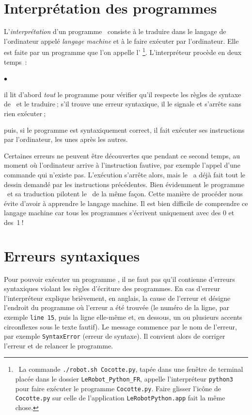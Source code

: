 \section{Interprétation des programmes} 
L'{\em interprétation} d'un programme \python\ consiste à le traduire 
dans le langage de l'or\-di\-na\-teur
appelé {\em langage machine} et à le faire exécuter par l'ordinateur. 
Elle est faite par un programme
que l'on appelle l' \python\@\footnote{\ La commande 
{\tt ./robot.sh Cocotte.py}, tapée dans une 
fenêtre de terminal placée dans le dossier {\tt LeRobot\_Python\_FR}, appelle l'interpréteur 
{\tt python3} pour faire exécuter le programme {\tt Cocotte.py}. Faire glisser l'icône de 
{\tt Cocotte.py} sur celle de l'application {\tt LeRobotPython.app} fait la même chose.}.
L'interpréteur procède en deux temps~:
\begin{list}{$\scriptscriptstyle\bullet$}{
\renewcommand{\rightmargin}{0mm}
}
\item il lit d'abord {\em tout} le programme pour vérifier qu'il respecte les règles 
de syntaxe de \python\ et le traduire$\:$; s'il trouve une erreur syntaxique, il le signale 
et s'arrête sans rien exécuter$\:$;
\item puis, si le programme est syntaxiquement correct, il fait exécuter ses 
instructions par l'ordinateur, les unes après les autres.
\end{list}
Certaines erreurs ne peuvent être découvertes que pendant ce second temps, au moment où 
l'or\-di\-na\-teur arrive à l'instruction fautive, par exemple l'appel d'une commande qui n'existe 
pas. L'exécution s'arrête alors, mais le \robot\ a déjà fait tout le dessin demandé 
par les instructions précédentes.
Bien évidemment le programme \python\ et sa traduction pilotent
le \robot\ de la même façon. Cette manière de procéder nous 
évite d'avoir à apprendre le langage machine. Il est bien difficile
de comprendre ce langage machine car tous les programmes s'écrivent
uniquement avec des 0 et \hbox{des 1$\:$!}

\section{Erreurs syntaxiques} 

Pour pouvoir exécuter un programme \python, il ne faut pas qu'il contienne
d'erreurs syntaxiques violant les règles
d'écriture des programmes. En cas d'erreur l'interpréteur explique 
brièvement, en anglais, la cause de l'erreur et désigne l'endroit du programme
où l'er\-reur a été trouvée (le numéro de la ligne, par exemple {\tt line 15}, puis la ligne 
elle-même et, en dessous, un ou plusieurs 
accents circonflexes {\idt {}} sous le texte fautif). Le message commence par 
le nom de l'erreur, par exemple {\tt SyntaxError} (erreur de syntaxe). Il convient alors de
corriger l'erreur et de relancer le programme.

